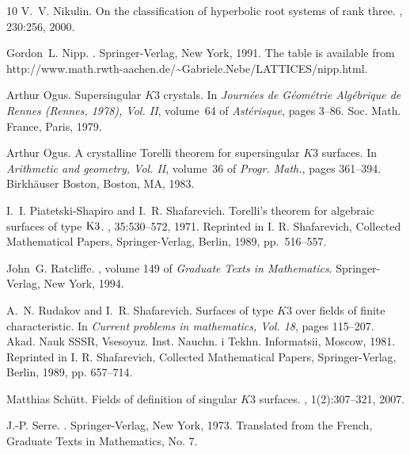 \documentclass{amsart}
\theoremstyle{plain}
\theoremstyle{definition}
\theoremstyle{remark}
\numberwithin{equation}{section}
\numberwithin{table}{section}
\numberwithin{figure}{section}
\begin{document}
\begin{thebibliography}{10}
V.~V. Nikulin.
\newblock On the classification of hyperbolic root systems of rank three.
, 230:256, 2000.

Gordon~L. Nipp.
.
\newblock Springer-Verlag, New York, 1991.
\newblock The table is available from
  http://www.math.rwth-aachen.de/\~{}Gabriele.Nebe/LATTICES/nipp.html.

Arthur Ogus.
\newblock Supersingular {$K3$} crystals.
\newblock In {\em Journ\'ees de G\'eom\'etrie Alg\'ebrique de Rennes (Rennes,
  1978), Vol. II}, volume~64 of {\em Ast\'erisque}, pages 3--86. Soc. Math.
  France, Paris, 1979.

Arthur Ogus.
\newblock A crystalline {T}orelli theorem for supersingular {$K3$} surfaces.
\newblock In {\em Arithmetic and geometry, Vol. II}, volume~36 of {\em Progr.
  Math.}, pages 361--394. Birkh\"auser Boston, Boston, MA, 1983.

I.~I. Piatetski-Shapiro and I.~R. Shafarevich.
\newblock Torelli's theorem for algebraic surfaces of type {${\rm K}3$}.
, 35:530--572, 1971.
\newblock Reprinted in I. R. Shafarevich, Collected Mathematical Papers,
  Springer-Verlag, Berlin, 1989, pp.~516--557.

John~G. Ratcliffe.
, volume 149 of {\em
  Graduate Texts in Mathematics}.
\newblock Springer-Verlag, New York, 1994.

A.~N. Rudakov and I.~R. Shafarevich.
\newblock Surfaces of type {$K3$} over fields of finite characteristic.
\newblock In {\em Current problems in mathematics, Vol. 18}, pages 115--207.
  Akad. Nauk SSSR, Vsesoyuz. Inst. Nauchn. i Tekhn. Informatsii, Moscow, 1981.
\newblock Reprinted in I. R. Shafarevich, Collected Mathematical Papers,
  Springer-Verlag, Berlin, 1989, pp. 657--714.

Matthias Sch{\"u}tt.
\newblock Fields of definition of singular {$K3$} surfaces.
, 1(2):307--321, 2007.

J.-P. Serre.
.
\newblock Springer-Verlag, New York, 1973.
\newblock Translated from the French, Graduate Texts in Mathematics, No. 7.




\end{thebibliography}
\end{document}
